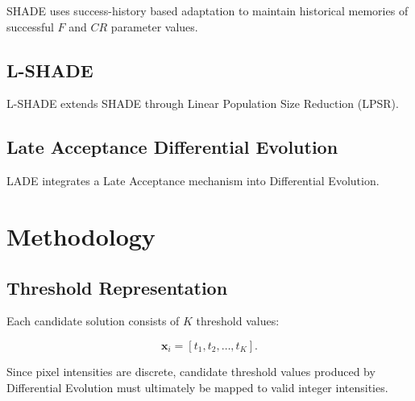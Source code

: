\documentclass[review]{elsarticle}
\begin{document}
SHADE uses success-history based adaptation to maintain historical
memories of successful $F$ and $CR$ parameter values.



\subsection{L-SHADE}

L-SHADE extends SHADE through Linear Population Size Reduction (LPSR).



\subsection{Late Acceptance Differential Evolution}

LADE integrates a Late Acceptance mechanism into Differential Evolution.

%



\section{Methodology}
\label{sec:methodology}


\subsection{Threshold Representation}

Each candidate solution consists of $K$ threshold values:

\begin{equation}
\mathbf{x}_i =
[t_1,t_2,\ldots,t_K].
\end{equation}

Since pixel intensities are discrete, candidate threshold values produced
by Differential Evolution must ultimately be mapped to valid integer
intensities.
\end{document}
